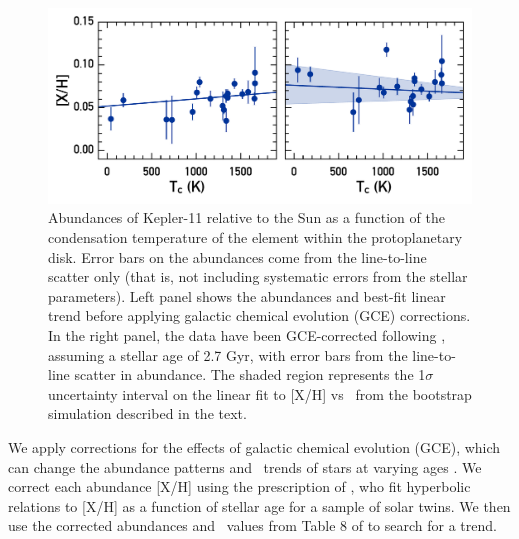 \documentclass[oneside]{emulateapj}
\begin{document}
\begin{figure}
\centering
\includegraphics[scale=0.6]{K11_Tc_linear}
\caption{Abundances of Kepler-11 relative to the Sun as a function of the condensation temperature of the element within the protoplanetary disk. Error bars on the abundances come from the line-to-line scatter only (that is, not including systematic errors from the stellar parameters). Left panel shows the abundances and best-fit linear trend before applying galactic chemical evolution (GCE) corrections. In the right panel, the data have been GCE-corrected following \citet{Spina2016b}, assuming a stellar age of 2.7 Gyr, with error bars from the line-to-line scatter in abundance. The shaded region represents the 1$\sigma$ uncertainty interval on the linear fit to [X/H] vs \tc\ from the bootstrap simulation described in the text.}
\label{fig:tc}
\end{figure}

We apply corrections for the effects of galactic chemical evolution (GCE), which can change the abundance patterns and \tc\ trends of stars at varying ages \citep{Nissen2015, Spina2016}. We correct each abundance [X/H] using the prescription of \citet{Spina2016b}, who fit hyperbolic relations to [X/H] as a function of stellar age for a sample of solar twins. We then use the corrected abundances and \tc\ values from Table 8 of \citet{Lodders2003} to search for a trend.
\end{document}
